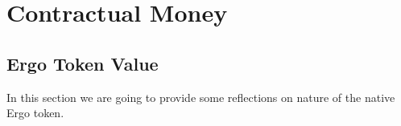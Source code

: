 \section{Contractual Money}
    \label{sec:contractual}




\subsection{Ergo Token Value}
 \label{sec:ergo-value}

 In this section we are going to provide some reflections on nature of the native Ergo token.
